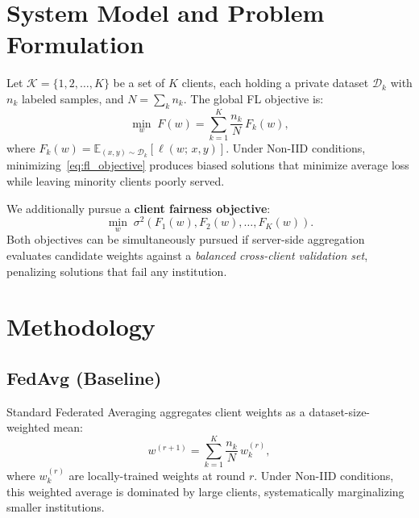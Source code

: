 \documentclass[conference]{IEEEtran}
\begin{document}
\section{System Model and Problem Formulation}
\label{sec:problem}

Let $\mathcal{K} = \{1, 2, \ldots, K\}$ be a set of $K$ clients, each
holding a private dataset $\mathcal{D}_k$ with $n_k$ labeled samples, and
$N = \sum_k n_k$. The global FL objective is:
\begin{equation}
    \min_{w}\; F(w) = \sum_{k=1}^{K} \frac{n_k}{N}\, F_k(w),
    \label{eq:fl_objective}
\end{equation}
where $F_k(w) = \mathbb{E}_{(x,y)\sim\mathcal{D}_k}[\ell(w;\,x,y)]$.
Under Non-IID conditions, minimizing~\eqref{eq:fl_objective} produces biased
solutions that minimize average loss while leaving minority clients poorly
served.

We additionally pursue a \textbf{client fairness objective}:
\begin{equation}
    \min_{w}\; \sigma^2\!\left(F_1(w), F_2(w), \ldots, F_K(w)\right).
    \label{eq:fairness_objective}
\end{equation}
Both objectives can be simultaneously pursued if server-side aggregation
evaluates candidate weights against a \emph{balanced cross-client validation
set}, penalizing solutions that fail any institution.

\section{Methodology}
\label{sec:method}

\subsection{FedAvg (Baseline)}
Standard Federated Averaging \cite{mcmahan2017} aggregates client weights as
a dataset-size-weighted mean:
\begin{equation}
    w^{(r+1)} = \sum_{k=1}^{K} \frac{n_k}{N}\, w_k^{(r)},
    \label{eq:fedavg}
\end{equation}
where $w_k^{(r)}$ are locally-trained weights at round $r$. Under Non-IID
conditions, this weighted average is dominated by large clients, systematically
marginalizing smaller institutions.
\end{document}
